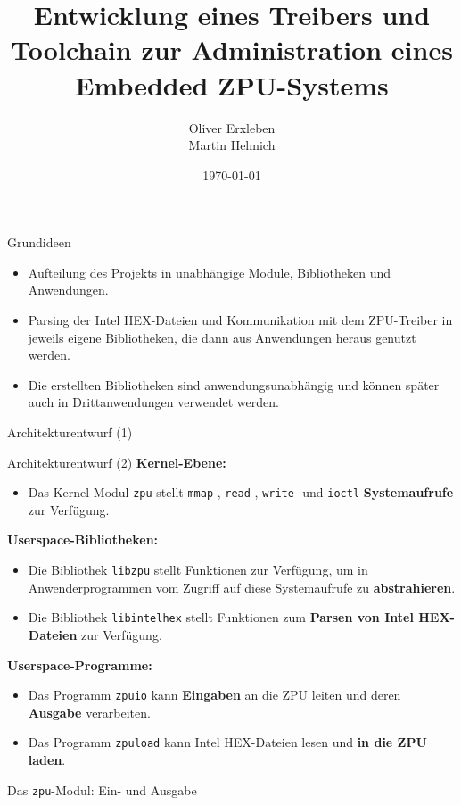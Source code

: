 \documentclass[10pt]{beamer}
\title{Entwicklung eines Treibers und Toolchain zur Administration eines Embedded ZPU-Systems}
\author{Oliver Erxleben\\Martin Helmich}
\institute{Hochschule Osnabrück}
\date{\today}
\begin{document}
	\frame{\titlepage}
	
	\begin{frame}{Grundideen}
		\begin{itemize}
			\item Aufteilung des Projekts in unabhängige Module, Bibliotheken und Anwendungen.
			\item Parsing der Intel HEX-Dateien und Kommunikation mit dem ZPU-Treiber in jeweils eigene Bibliotheken, die dann aus Anwendungen heraus genutzt werden.
			\item Die erstellten Bibliotheken sind anwendungsunabhängig und können später auch in Drittanwendungen verwendet werden.
		\end{itemize}
	\end{frame}

	\begin{frame}{Architekturentwurf (1)}
		
	\end{frame}
	
	\begin{frame}{Architekturentwurf (2)}
		\textbf{Kernel-Ebene:}
		\begin{itemize}
			\item Das Kernel-Modul \texttt{zpu} stellt \texttt{mmap}-, \texttt{read}-, \texttt{write}- und \texttt{ioctl}-\textbf{Systemaufrufe} zur Verfügung.
		\end{itemize}
		\textbf{Userspace-Bibliotheken:}
		\begin{itemize}
			\item Die Bibliothek \texttt{libzpu} stellt Funktionen zur Verfügung, um in Anwenderprogrammen vom Zugriff auf diese Systemaufrufe zu \textbf{abstrahieren}.
			\item Die Bibliothek \texttt{libintelhex} stellt Funktionen zum \textbf{Parsen von Intel HEX-Dateien} zur Verfügung.
		\end{itemize}
		\textbf{Userspace-Programme:}
		\begin{itemize}
			\item Das Programm \texttt{zpuio} kann \textbf{Eingaben} an die ZPU leiten und deren \textbf{Ausgabe} verarbeiten.
			\item Das Programm \texttt{zpuload} kann Intel HEX-Dateien lesen und \textbf{in die ZPU laden}.
		\end{itemize}
	\end{frame}
	
	\begin{frame}{Das \texttt{zpu}-Modul: Ein- und Ausgabe}
		\begin{center}
			
		\end{center}
	\end{frame}
	
\end{document}
